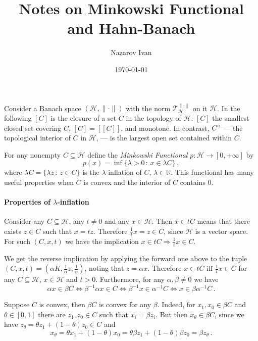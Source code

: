 \documentclass[a4paper]{article}
\title{Notes on Minkowski Functional and Hahn-Banach}
\author{Nazarov Ivan}
\date{\today}
\newcommand{\Hcal}{\mathcal{H}}
\newcommand{\real}{\mathbb{R}}
\newcommand{\interior}[1]{%
  {\kern0pt#1}^{\mathrm{o}}%
}
\newcommand{\Tcal}{\mathcal{T}}
\begin{document}
\maketitle

Consider a Banach space $(\Hcal, \|\cdot\|)$ with the norm $\Tcal^{\|\cdot\|}_\Hcal$
on it $\Hcal$. In the following $[C]$ is the closure of a set $C$ in the topology
of $\Hcal$: $[C]$ the smallest closed set covering $C$, $[C] = [[C]]$, and monotone.
In contrast, $\interior{C}$ --- the topological interior of $C$ in $\Hcal$, --- is
the largest open set contained within $C$.

For any nonempty $C \subseteq \Hcal$ define the {\it Minkowski Functional} $p\colon
\Hcal \to [0, +\infty]$ by
\begin{equation*}
  p(x)
    = \inf \bigl\{ \lambda > 0\,:\, x \in \lambda C\bigr\}
    \,,
\end{equation*}
where $\lambda C = \{\lambda z \,:\, z\in C\}$ is the $\lambda$-inflation of $C$,
$\lambda \in\real$. This functional has many useful properties when $C$ is convex
and the interior of $C$ contains $0$.

\paragraph{Properties of $\lambda$-inflation} %
\label{par:properties_of_lambda_inflation}

Consider any $C\subseteq \Hcal$, any $t \neq 0$ and any $x\in \Hcal$. Then $x\in t C$
means that there exists $z \in C$ such that $x = t z$. Therefore $\tfrac1t x = z
\in C$, since $\Hcal$ is a vector space. For such $(C, x, t)$ we have the implication
$x \in t C \Rightarrow \tfrac1t x \in C$.

We get the reverse implication by applying the forward one above to the tuple $(C, x, t)
= (\alpha K, \tfrac1\alpha z, \tfrac1\alpha)$, noting that $z = \alpha x$. Therefore
$x\in t C$ iff $\tfrac1t x \in C$ for any $C\subseteq \Hcal$, $x\in \Hcal$ and $t > 0$.
Furthermore, for any $\alpha, \beta \neq 0$ we have
\begin{equation*}
  \alpha x \in \beta C \Leftrightarrow
  \beta^{-1} \alpha x \in C \Leftrightarrow
  \beta^{-1} x \in \alpha^{-1} C \Leftrightarrow
  x \in \beta \alpha^{-1} C
  \,.
\end{equation*}

Suppose $C$ is convex, then $\beta C$ is convex for any $\beta$. Indeed, for $x_1,
x_0 \in \beta C$ and $\theta\in [0, 1]$ there are $z_1, z_0 \in C$ such that $x_i
= \beta z_i$. But then $x_\theta \in \beta C$, since we have $z_\theta = \theta z_1
+ (1-\theta) z_0 \in C$ and
\begin{equation*}
  x_\theta
  = \theta x_1 + (1-\theta) x_0
  = \theta \beta z_1 + (1-\theta) \beta z_0
  = \beta z_\theta
  \,.
\end{equation*}
\end{document}
